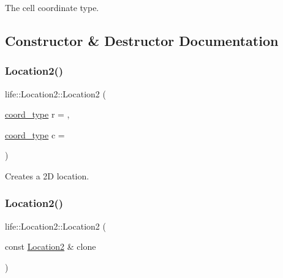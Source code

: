 The cell coordinate type. 



\subsection{Constructor \& Destructor Documentation}
\mbox{\label{structlife_1_1_location2_a936ccf640d934f1b493626b3c64e3cb9}} 
\subsubsection{\texorpdfstring{Location2()}{Location2()}\hspace{0.1cm}{\footnotesize\ttfamily [1/2]}}
{\footnotesize\ttfamily life\+::\+Location2\+::\+Location2 (\begin{DoxyParamCaption}\item[{\mbox{\hyperlink{structlife_1_1_location2_abad0c81db789cf9a9f4396ac0c0ef06b}{coord\+\_\+type}}}]{r = {},  }\item[{\mbox{\hyperlink{structlife_1_1_location2_abad0c81db789cf9a9f4396ac0c0ef06b}{coord\+\_\+type}}}]{c = {} }\end{DoxyParamCaption})\hspace{0.3cm}{\ttfamily [inline]}}



Creates a 2D location. 

\mbox{\label{structlife_1_1_location2_a41c5bb5f81eb5b9325b4a65fc1bb920e}} 
\subsubsection{\texorpdfstring{Location2()}{Location2()}\hspace{0.1cm}{\footnotesize\ttfamily [2/2]}}
{\footnotesize\ttfamily life\+::\+Location2\+::\+Location2 (\begin{DoxyParamCaption}\item[{const \mbox{\hyperlink{structlife_1_1_location2}{Location2}} \&}]{clone }\end{DoxyParamCaption})\hspace{0.3cm}{\ttfamily [inline]}}



